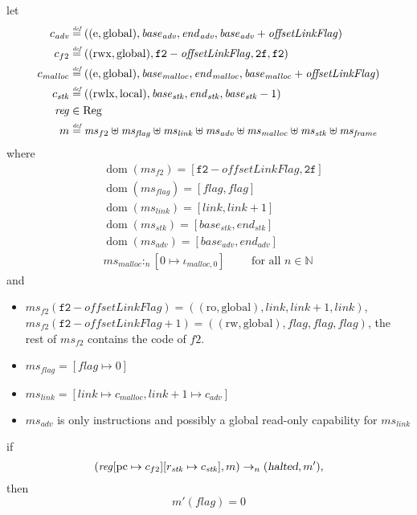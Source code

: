 \documentclass[a4paper]{article}
\newcommand{\update}[2]{[#1 \mapsto #2]}
\newcommand{\defeq}{\stackrel{\textit{\tiny{def}}}{=}}
\DeclareMathOperator{\dom}{dom}
\newcommand{\var}[1]{\mathit{#1}}
\newcommand{\hs}{\var{ms}}
\newcommand{\ms}{\hs}
\newcommand{\pcreg}{\mathrm{pc}}
\newcommand{\start}{\var{base}}
\newcommand{\addrend}{\var{end}}
\newcommand{\reg}{\var{reg}}
\newcommand{\heap}{\var{mem}}
\newcommand{\adv}{\var{adv}}
\newcommand{\link}{\var{link}}
\newcommand{\stk}{\var{stk}}
\newcommand{\flag}{\var{flag}}
\newcommand{\olf}{\var{offsetLinkFlag}}
\newcommand{\halted}{\textsl{halted}}
\newcommand{\heapSat}[3][\heap]{#1 :_{#2} #3}
\newcommand{\codelabel}[1]{\mathit{#1}}
\newcommand{\malloc}{\codelabel{malloc}}
\newcommand{\plaindom}[1]{\mathrm{#1}}
\newcommand{\Regs}{\plaindom{Reg}}
\newcommand{\nats}{\mathbb{N}}
\newcommand{\plainperm}[1]{\mathrm{#1}}
\newcommand{\readonly}{\plainperm{ro}}
\newcommand{\readwrite}{\plainperm{rw}}
\newcommand{\entry}{\plainperm{e}}
\newcommand{\rwx}{\plainperm{rwx}}
\newcommand{\rwlx}{\plainperm{rwlx}}
\newcommand{\local}{\plainperm{local}}
\newcommand{\glob}{\plainperm{global}}
\newcommand{\step}[1][]{\rightarrow_{#1}}
\begin{document}
\begin{lemma}
  \label{lem:correctness-f2}
  let
  \begin{align*}
    c_{\var{adv}} & \defeq ((\entry,\glob),\start_{\adv},\addrend_{\adv},\start_{\adv}+\olf) \\
    c_{f2} & \defeq ((\rwx,\glob),\mathtt{f2}-\olf,\mathtt{2f},\mathtt{f2}) \\
    c_\malloc & \defeq ((\entry,\glob),\start_\malloc,\addrend_\malloc,\start_\malloc+\olf) \\
    c_{\var{stk}} & \defeq ((\rwlx,\local),\start_\stk,\addrend_\stk,\start_\stk-1) \\
    \reg & \in \Regs \\
    m & \defeq \hs_{f2} \uplus 
        \hs_\flag \uplus                
        \ms_{\var{link}} \uplus 
        \hs_\adv \uplus 
        \ms_{\malloc} \uplus 
        \ms_{\var{stk}} \uplus
        \ms_{\var{frame}} 
  \end{align*}
  where 
  \begin{align*}
    &\dom(\hs_{f2}) = [\mathtt{f2}-\olf,\mathtt{2f}] \\
    &\dom(\hs_\flag) = [\flag,\flag] \\
    &\dom(\ms_\link) = [\link,\link+1]\\
    &\dom(\ms_\stk) = [\start_\stk, \addrend_\stk]\\
    &\dom(\hs_{\adv}) = [\start_\adv,\addrend_\adv] \\
    &\heapSat[\hs_{\malloc}]{n}{[0 \mapsto \iota_{\malloc,0}]} \qquad \text{ for all $n \in \nats$}
  \end{align*}
  and
  \begin{itemize}
  \item $\ms_{f2}(\mathtt{f2}-\olf) = ((\readonly,\glob),\link,\link+1,\link)$, $\ms_{f2}(\mathtt{f2}-\olf+1) = ((\readwrite,\glob),\flag,\flag,\flag)$, the rest of $\hs_{f2}$ contains the code of $f2$.
  \item $\ms_\flag = [\flag \mapsto 0]$
  \item $\ms_{\var{link}} = [\var{link} \mapsto c_\malloc, \var{link} + 1 \mapsto c_\adv]$
  \item $\hs_\adv$ is only instructions and possibly a global read-only capability for $\hs_\link$
  \end{itemize}
  if 
  \[
    (\reg\update{\pcreg}{c_{f2}}\update{r_\stk}{c_\stk},m) \step[n] (\halted,m'),
  \]
  then
  \[
    m'(\flag) = 0
  \]  
\end{lemma}
\end{document}
